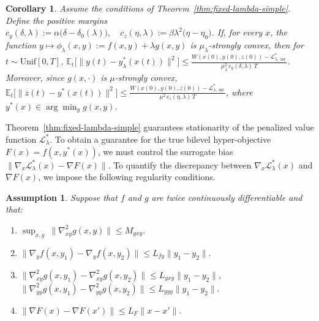 \documentclass{article}
\newtheorem{corollary}[theorem]{Corollary}
\newtheorem{assumption}[theorem]{Assumption}
\newcommand{\1}{\mathbf{1}}
\begin{document}
\begin{corollary}\label{cor:bilevel-tracking}
Assume the conditions of Theorem~\ref{thm:fixed-lambda-simple}.
Define the positive margins $c_y(\delta,\lambda):=\alpha\bigl(\delta-\delta_0(\lambda)\bigr),\quad
c_z(\eta,\lambda):=\beta\lambda^2\bigl(\eta-\eta_0\bigr)$.
If, for every $x$, the function
\(
y\mapsto \phi_\lambda(x,y):=f(x,y)+\lambda g(x,y)
\)
is $\mu_\lambda$-strongly convex, then for $t\sim\mathrm{Unif}[0,T]$, $\mathbb E_t\bigl[\|y(t)-y_\lambda^*(x(t))\|^2\bigr]
\le
\frac{W(x(0),y(0),z(0))-\mathcal L_{\lambda,\inf}^{*}}
{\mu_\lambda^2\,c_y(\delta,\lambda)\,T}$.
Moreover, since $g(x,\cdot)$ is $\mu$-strongly convex, $\mathbb E_t\bigl[\|z(t)-y^*(x(t))\|^2\bigr]
\le
\frac{W(x(0),y(0),z(0))-\mathcal L_{\lambda,\inf}^{*}}
{\mu^2\,c_z(\eta,\lambda)\,T}$,
where $y^*(x)\in\arg\min_y g(x,y)$.
\end{corollary}
Theorem~\ref{thm:fixed-lambda-simple} guarantees stationarity of the penalized value function $\mathcal L_\lambda^*$.
To obtain a guarantee for the true bilevel hyper-objective $F(x)=f(x,y^*(x))$, we must control the surrogate bias
$\|\nabla_x\mathcal L_\lambda^*(x)-\nabla F(x)\|$. To quantify the discrepancy between $\nabla_x\mathcal L_\lambda^{*}(x)$ and $\nabla F(x)$, we impose the following
regularity conditions.
\begin{assumption}\label{ass:3}
Suppose that $f$ and $g$ are twice continuously differentiable and that:
\begin{enumerate}[leftmargin=*]
\item $\displaystyle \sup_{x,y}\ \|\nabla_{xy}^{2}g(x,y)\|
\le M_{gxy}.$
\item $\displaystyle \|\nabla_y f(x,y_1)-\nabla_y f(x,y_2)\|
\le L_{fy}\|y_1-y_2\|.$
\item $\displaystyle \|\nabla_{xy}^{2}g(x,y_1)-\nabla_{xy}^{2}g(x,y_2)\|
\le L_{gxy}\|y_1-y_2\|$, 
$\displaystyle \|\nabla_{yy}^{2}g(x,y_1)-\nabla_{yy}^{2}g(x,y_2)\|
\le L_{gyy}\|y_1-y_2\|.$
\item $\|\nabla F(x)-\nabla F(x')\|\le L_F\|x-x'\|.$
\end{enumerate}
\end{assumption}
\end{document}
